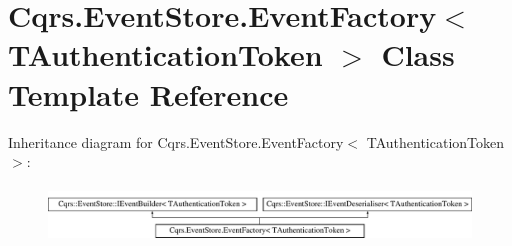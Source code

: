 \hypertarget{classCqrs_1_1EventStore_1_1EventFactory}{}\section{Cqrs.\+Event\+Store.\+Event\+Factory$<$ T\+Authentication\+Token $>$ Class Template Reference}
\label{classCqrs_1_1EventStore_1_1EventFactory}
Inheritance diagram for Cqrs.\+Event\+Store.\+Event\+Factory$<$ T\+Authentication\+Token $>$\+:\begin{figure}[H]
\begin{center}
\leavevmode
\includegraphics[height=1.521739cm]{classCqrs_1_1EventStore_1_1EventFactory}
\end{center}
\end{figure}
